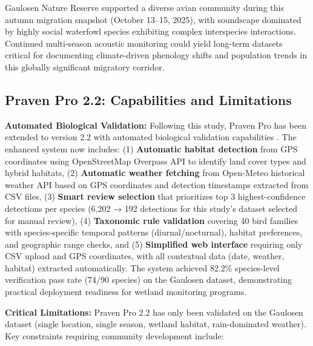 \documentclass[twocolumn]{article}
\begin{document}
Gaulosen Nature Reserve supported a diverse avian community during this autumn migration snapshot (October 13--15, 2025), with soundscape dominated by highly social waterfowl species exhibiting complex interspecies interactions. Continued multi-season acoustic monitoring could yield long-term datasets critical for documenting climate-driven phenology shifts and population trends in this globally significant migratory corridor.

\subsection{Praven Pro 2.2: Capabilities and Limitations}

\textbf{Automated Biological Validation:} Following this study, Praven Pro has been extended to version 2.2 with automated biological validation capabilities \citep{Redpath2025}. The enhanced system now includes: (1) \textbf{Automatic habitat detection} from GPS coordinates using OpenStreetMap Overpass API to identify land cover types and hybrid habitats, (2) \textbf{Automatic weather fetching} from Open-Meteo historical weather API based on GPS coordinates and detection timestamps extracted from CSV files, (3) \textbf{Smart review selection} that prioritizes top 3 highest-confidence detections per species (6,202 → 192 detections for this study's dataset selected for manual review), (4) \textbf{Taxonomic rule validation} covering 40 bird families with species-specific temporal patterns (diurnal/nocturnal), habitat preferences, and geographic range checks, and (5) \textbf{Simplified web interface} requiring only CSV upload and GPS coordinates, with all contextual data (date, weather, habitat) extracted automatically. The system achieved 82.2\% species-level verification pass rate (74/90 species) on the Gaulosen dataset, demonstrating practical deployment readiness for wetland monitoring programs.

\textbf{Critical Limitations:} Praven Pro 2.2 has only been validated on the Gaulosen dataset (single location, single season, wetland habitat, rain-dominated weather). Key constraints requiring community development include:
\end{document}

